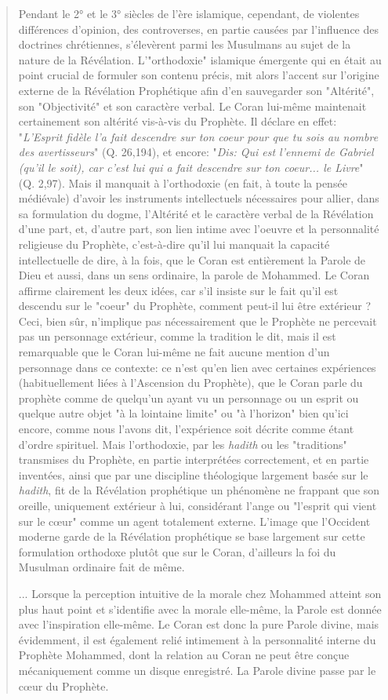 \begin{quote}
Pendant le 2° et le 3° siècles de l'ère islamique, cependant, de
violentes différences d'opinion, des controverses, en partie causées par
l'influence des doctrines chrétiennes, s'élevèrent parmi les Musulmans
au sujet de la nature de la Révélation. L'"orthodoxie" islamique
émergente qui en était au point crucial de formuler son contenu précis,
mit alors l'accent sur l'origine externe de la Révélation Prophétique
afin d'en sauvegarder son "Altérité", son "Objectivité" et son caractère
verbal. Le Coran lui-même maintenait certainement son altérité vis-à-vis
du Prophète. Il déclare en effet: "\emph{L'Esprit fidèle l'a fait
descendre sur ton coeur pour que tu sois au nombre des avertisseurs}"
(Q. 26,194), et encore: "\emph{Dis: Qui est l'ennemi de Gabriel (qu'il
le soit), car c'est lui qui a fait descendre sur ton coeur... le Livre}"
(Q. 2,97). Mais il manquait à l'orthodoxie (en fait, à toute la pensée
médiévale) d'avoir les instruments intellectuels nécessaires pour
allier, dans sa formulation du dogme, l'Altérité et le caractère verbal
de la Révélation d'une part, et, d'autre part, son lien intime avec
l'oeuvre et la personnalité religieuse du Prophète, c'est-à-dire qu'il
lui manquait la capacité intellectuelle de dire, à la fois, que le Coran
est entièrement la Parole de Dieu et aussi, dans un sens ordinaire, la
parole de Mohammed. Le Coran affirme clairement les deux idées, car s'il
insiste sur le fait qu'il est descendu sur le "coeur" du Prophète,
comment peut-il lui être extérieur ? Ceci, bien sûr, n'implique pas
nécessairement que le Prophète ne percevait pas un personnage extérieur,
comme la tradition le dit, mais il est remarquable que le Coran lui-même
ne fait aucune mention d'un personnage dans ce contexte: ce n'est qu'en
lien avec certaines expériences (habituellement liées à l'Ascension du
Prophète), que le Coran parle du prophète comme de quelqu'un ayant vu un
personnage ou un esprit ou quelque autre objet "à la lointaine limite"
ou "à l'horizon" bien qu'ici encore, comme nous l'avons dit,
l'expérience soit décrite comme étant d'ordre spirituel. Mais
l'orthodoxie, par les \emph{hadith} ou les "traditions" transmises du
Prophète, en partie interprétées correctement, et en partie inventées,
ainsi que par une discipline théologique largement basée sur le
\emph{hadith}, fit de la Révélation prophétique un phénomène ne frappant
que son oreille, uniquement extérieur à lui, considérant l'ange ou
"l'esprit qui vient sur le cœur" comme un agent totalement externe.
L'image que l'Occident moderne garde de la Révélation prophétique se
base largement sur cette formulation orthodoxe plutôt que sur le Coran,
d'ailleurs la foi du Musulman ordinaire fait de même.

... Lorsque la perception intuitive de la morale chez Mohammed atteint
son plus haut point et s'identifie avec la morale elle-même, la Parole
est donnée avec l'inspiration elle-même. Le Coran est donc la pure
Parole divine, mais évidemment, il est également relié intimement à la
personnalité interne du Prophète Mohammed, dont la relation au Coran ne
peut être conçue mécaniquement comme un disque enregistré. La Parole
divine passe par le cœur du Prophète.
 \end{quote}


